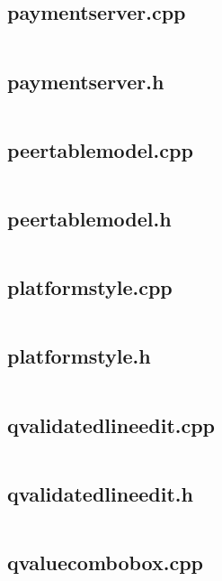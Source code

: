 \documentclass{article}
\begin{document}
\subsection{paymentserver.cpp}
\inputminted{cpp}{/home/dufferzafar/dev/@clones/bitcoin/src/qt/paymentserver.cpp}
\newpage

\subsection{paymentserver.h}
\inputminted{cpp}{/home/dufferzafar/dev/@clones/bitcoin/src/qt/paymentserver.h}
\newpage

\subsection{peertablemodel.cpp}
\inputminted{cpp}{/home/dufferzafar/dev/@clones/bitcoin/src/qt/peertablemodel.cpp}
\newpage

\subsection{peertablemodel.h}
\inputminted{cpp}{/home/dufferzafar/dev/@clones/bitcoin/src/qt/peertablemodel.h}
\newpage

\subsection{platformstyle.cpp}
\inputminted{cpp}{/home/dufferzafar/dev/@clones/bitcoin/src/qt/platformstyle.cpp}
\newpage

\subsection{platformstyle.h}
\inputminted{cpp}{/home/dufferzafar/dev/@clones/bitcoin/src/qt/platformstyle.h}
\newpage

\subsection{qvalidatedlineedit.cpp}
\inputminted{cpp}{/home/dufferzafar/dev/@clones/bitcoin/src/qt/qvalidatedlineedit.cpp}
\newpage

\subsection{qvalidatedlineedit.h}
\inputminted{cpp}{/home/dufferzafar/dev/@clones/bitcoin/src/qt/qvalidatedlineedit.h}
\newpage

\subsection{qvaluecombobox.cpp}
\inputminted{cpp}{/home/dufferzafar/dev/@clones/bitcoin/src/qt/qvaluecombobox.cpp}
\newpage
\end{document}
